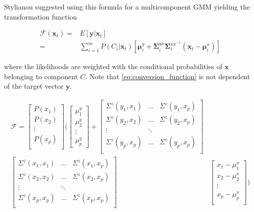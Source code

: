 Stylianou \etal \cite{stylianou95} suggested using this formula for a multicomponent GMM yielding the transformation function
\newcommand{\fff}{\mathcal F}
\begin{definition}
	\begin{equation}
		\label{eq:conversion_function}
		\begin{split}
			\fff(\mathbf{x}_t) =& E[\mathbf{y}\vert \mathbf{x}_t]\\
			=& \sum_{i=1}^{m}P(C_i \vert \mathbf{x}_t)[\boldsymbol{\mu}_i^y + \mathbf{\Sigma}_i^{yx} \mathbf{\Sigma}_i^{xx^{-1}} (\mathbf{x}_t-\boldsymbol{\mu}_i^x)]
		\end{split}
	\end{equation}
\end{definition}
where the likelihoods are weighted with the conditional probabilities of $\mathbf{x}$ belonging to component $C$. Note that \eqref{eq:conversion_function} is not dependent of the target vector $\mathbf{y}$.

\begin{equation}
	\begin{split}
		\fff=\begin{bmatrix}
			P(x_1) \\
			P(x_2) \\
			\vdots \\
			P(x_p) \\
		\end{bmatrix}\Bigg(
		\begin{bmatrix}
			\mu_1^y \\
			\mu_2^y \\
			\vdots \\
			\mu_p^y
		\end{bmatrix} + 
		\begin{bmatrix}
			\Sigma^z(y_1,x_1) & \dots & \Sigma^z(y_1,x_p) \\
			\Sigma^z(y_2,x_2) & \dots & \Sigma^z(y_2,x_p)\\
			\vdots & \ddots & \\
			\Sigma^z(y_p,x_p) & \dots & \Sigma^z(y_p,x_p)\\
		\end{bmatrix} & \\
		\begin{bmatrix}
			\Sigma^z(x_1,x_1) & \dots & \Sigma^z(x_1,x_p) \\
			\Sigma^z(x_2,x_2) & \dots & \Sigma^z(x_2,x_p)\\
			\vdots & \ddots & \\
			\Sigma^z(x_p,x_p) & \dots & \Sigma^z(x_p,x_p)\\
		\end{bmatrix} &
		\begin{bmatrix}
			x_1 - \mu_1^x \\
			x_2 - \mu_2^x \\
			\vdots \\
			x_p - \mu_p^x \\
		\end{bmatrix}\Bigg)
	\end{split}
\end{equation}

